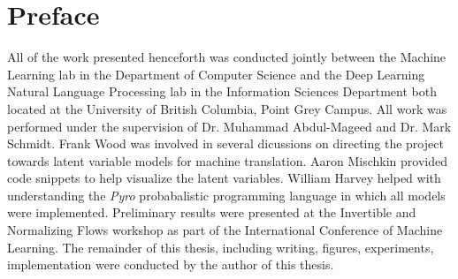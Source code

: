 
\chapter{Preface}

All of the work presented henceforth was conducted jointly between the Machine Learning lab in the Department of Computer Science and the Deep Learning Natural Language Processing lab in the Information Sciences Department both located at the University of British Columbia, Point Grey Campus. All work was performed under the supervision of Dr. Muhammad Abdul-Mageed and Dr. Mark Schmidt. Frank Wood was involved in several dicussions on directing the project towards latent variable models for machine translation. Aaron Mischkin provided code snippets to help visualize the latent variables. William Harvey helped with understanding the \textit{Pyro} probabalistic programming language in which all models were implemented. Preliminary results were presented at the Invertible and Normalizing Flows workshop as part of the International Conference of Machine Learning. The remainder of this thesis, including writing, figures, experiments, implementation were conducted by the author of this thesis.

